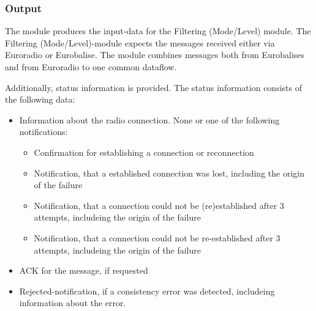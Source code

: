 \documentclass{template/openetcs_report}
\begin{document}


\subsubsection{Output}

The module produces the input-data for the Filtering (Mode/Level) module. The Filtering (Mode/Level)-module expects the messages received either via Euroradio or Eurobalise. The module combines messages both from Eurobalises and from Euroradio to one common dataflow.

Additionally, status information is provided. The status information consists of the following data:
\begin{itemize}
	\item Information about the radio connection. None or one of the following notifications:
	\begin{itemize}
		\item Confirmation for establishing a connection or reconnection
		\item Notification, that a established connection was lost, including the origin of the failure
		\item Notification, that a connection could not be (re)established after 3 attempts, includeing the origin of the failure
		\item Notification, that a connection could not be re-established after 3 attempts, includeing the origin of the failure
	\end{itemize}
	\item ACK for the message, if requested
	\item Rejected-notification, if a consistency error was detected, includeing information about the error.
\end{itemize}
\end{document}
